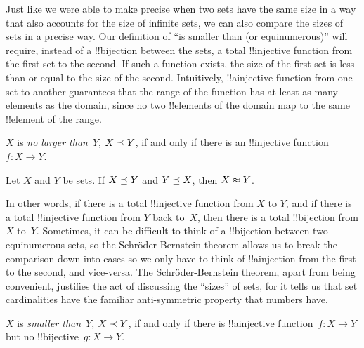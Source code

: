 \documentclass[../../../include/open-logic-section]{subfiles}
\begin{document}


\begin{explain}
Just like we were able to make precise when two sets have the same
size in a way that also accounts for the size of infinite sets, we can
also compare the sizes of sets in a precise way. Our definition of
``is smaller than (or equinumerous)'' will require, instead of a
!!{bijection} between the sets, a total !!{injective} function from the first
set to the second. If such a function exists, the size of the first
set is less than or equal to the size of the second. Intuitively,
!!a{injective} function from one set to another guarantees that the range of
the function has at least as many elements as the domain, since no two
!!{element}s of the domain map to the same !!{element} of the range.
\end{explain}

\begin{defn}
$X$ is \emph{no larger than}~$Y$, $X \preceq Y$, if and only if there
  is an !!{injective} function~$f \colon X \to Y$.
\end{defn}

\begin{thm}
  Let $X$ and $Y$ be sets. If $X \preceq Y$ and $Y \preceq X$,
  then $X \approx Y$.
\end{thm}

\begin{explain}
In other words, if there is a total !!{injective} function from $X$ to
$Y$, and if there is a total !!{injective} function from $Y$ back to~$X$,
then there is a total !!{bijection} from $X$ to~$Y$. Sometimes, it can be
difficult to think of a !!{bijection} between two equinumerous sets, so
the Schr\"oder-Bernstein theorem allows us to break the comparison
down into cases so we only have to think of !!a{injection} from the
first to the second, and vice-versa. The Schr\"oder-Bernstein theorem,
apart from being convenient, justifies the act of discussing the
``sizes'' of sets, for it tells us that set cardinalities have the
familiar anti-symmetric property that numbers have.
\end{explain}

\begin{defn}
$X$ is \emph{smaller than}~$Y$, $X \prec Y$, if and only if
  there is !!a{injective} function~$f\colon X \to Y$ but no
  !!{bijective}~$g\colon X \to Y$.
\end{defn}
\end{document}
